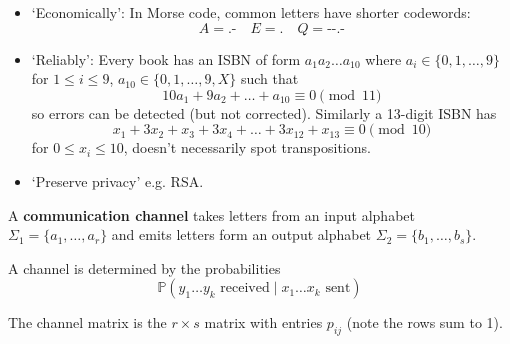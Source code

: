 \documentclass{article}
\newcommand{\Prob}{\mathbb{P}}
\newcommand{\1}[1]{\mathbbm{1}_{#1}}
\begin{document}
\begin{eg}
\leavevmode
\begin{itemize}[label={--}]
    \item `Economically': In Morse code, common letters have shorter codewords:
    \begin{equation*}
        A = \text{.-} \quad E = \text{.} \quad Q = \text{-{}-.-}
    \end{equation*}
    \item `Reliably': Every book has an ISBN of form $a_1 a_2 \dotsc a_{10}$ where $a_i \in \{0, 1, \dotsc, 9\}$ for $1 \leq i \leq 9$, $a_{10} \in \{0, 1, \dotsc, 9, X\}$ such that
    \begin{equation*}
        10 a_1 + 9 a_2 + \dotsc + a_{10} \equiv 0 \pmod{11}
    \end{equation*}
    so errors can be detected (but not corrected).
    Similarly a 13-digit ISBN has
    \begin{equation*}
        x_1 + 3 x_2 + x_3 + 3 x_4 + \dotsc + 3 x_{12} + x_{13} \equiv 0 \pmod{10}
    \end{equation*}
    for $0 \leq x_i \leq 10$, doesn't necessarily spot transpositions.
    \item `Preserve privacy' e.g. RSA.
\end{itemize}
\end{eg}

A \textbf{communication channel} takes letters from an input alphabet $\Sigma_1 = \{a_1, \dotsc, a_r\}$ and emits letters form an output alphabet $\Sigma_2 = \{b_1, \dotsc, b_s\}$.

A channel is determined by the probabilities
\begin{equation*}
    \Prob(y_1 \dotsc y_k \text{ received} \mid x_1 \dotsc x_k \text{ sent})
\end{equation*}


The channel matrix is the $r \times s$ matrix with entries $p_{ij}$ (note the rows sum to 1).
\end{document}
